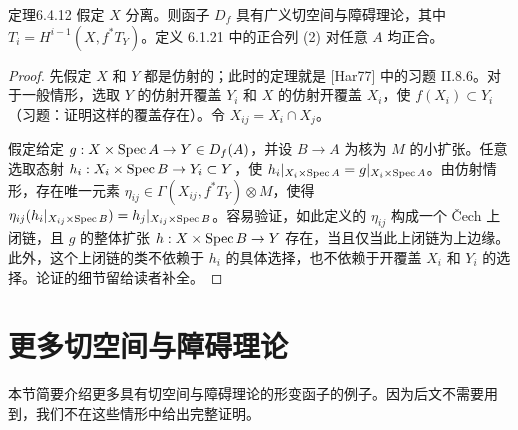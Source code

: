 \begin{origstatement}{定理}{6.4.12}\label{ch06:6.4.12}
假定 $X$ 分离。则函子 $D_f$ 具有广义切空间与障碍理论，其中 $T_i=H^{i-1}(X,f^*T_Y)$。定义 6.1.21 中的正合列 (2) 对任意 $A$ 均正合。
\end{origstatement}
\begin{proof}
先假定 $X$ 和 $Y$ 都是仿射的；此时的定理就是 [Har77] 中的习题 II.8.6。对于一般情形，选取 $Y$ 的仿射开覆盖 $Y_i$ 和 $X$ 的仿射开覆盖 $X_i$，使 $f(X_i)\subset Y_i$（习题：证明这样的覆盖存在）。令 $X_{ij}=X_i\cap X_j$。

假定给定 $g:X\times\operatorname{Spec} A\to Y\in D_f(A)$，并设 $B\to A$ 为核为 $M$ 的小扩张。任意选取态射 $h_i:X_i\times\operatorname{Spec} B\to Y_i\subset Y$，使 $h_i|_{X_i\times\operatorname{Spec} A}=g|_{X_i\times\operatorname{Spec} A}$。由仿射情形，存在唯一元素 $\eta_{ij}\in\Gamma(X_{ij},f^*T_Y)\otimes M$，使得 $\eta_{ij}(h_i|_{X_{ij}\times\operatorname{Spec} B})=h_j|_{X_{ij}\times\operatorname{Spec} B}$。容易验证，如此定义的 $\eta_{ij}$ 构成一个 Čech 上闭链，且 $g$ 的整体扩张 $h:X\times\operatorname{Spec} B\to Y$ 存在，当且仅当此上闭链为上边缘。此外，这个上闭链的类不依赖于 $h_i$ 的具体选择，也不依赖于开覆盖 $X_i$ 和 $Y_i$ 的选择。论证的细节留给读者补全。
\end{proof}
\section{更多切空间与障碍理论}
本节简要介绍更多具有切空间与障碍理论的形变函子的例子。因为后文不需要用到，我们不在这些情形中给出完整证明。

